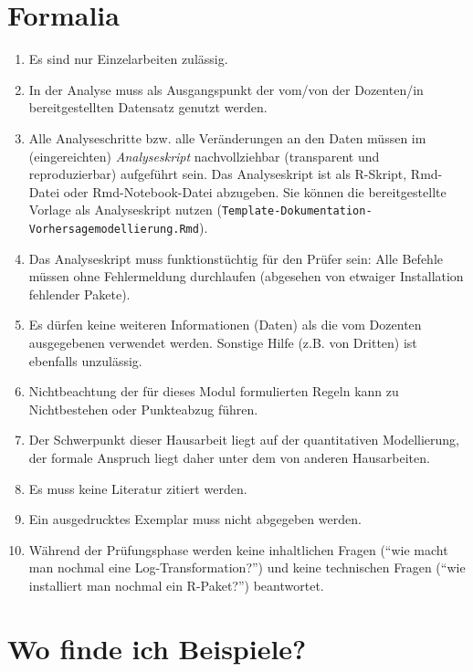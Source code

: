\documentclass[
]{book}
\begin{document}
\hypertarget{formalia}{%
\section{Formalia}\label{formalia}}

\begin{enumerate}
\def\labelenumi{\arabic{enumi}.}
\item
  Es sind nur Einzelarbeiten zulässig.
\item
  In der Analyse muss als Ausgangspunkt der vom/von der Dozenten/in bereitgestellten Datensatz genutzt werden.
\item
  Alle Analyseschritte bzw. alle Veränderungen an den Daten müssen im (eingereichten) \emph{Analyseskript} nachvollziehbar (transparent und reproduzierbar) aufgeführt sein. Das Analyseskript ist als R-Skript, Rmd-Datei oder Rmd-Notebook-Datei abzugeben. Sie können die bereitgestellte Vorlage als Analyseskript nutzen (\texttt{Template-Dokumentation-Vorhersagemodellierung.Rmd}).
\item
  Das Analyseskript muss funktionstüchtig für den Prüfer sein: Alle Befehle müssen ohne Fehlermeldung durchlaufen (abgesehen von etwaiger Installation fehlender Pakete).
\item
  Es dürfen keine weiteren Informationen (Daten) als die vom Dozenten ausgegebenen verwendet werden. Sonstige Hilfe (z.B. von Dritten) ist ebenfalls unzulässig.
\item
  Nichtbeachtung der für dieses Modul formulierten Regeln kann zu Nichtbestehen oder Punkteabzug führen.
\item
  Der Schwerpunkt dieser Hausarbeit liegt auf der quantitativen Modellierung, der formale Anspruch liegt daher unter dem von anderen Hausarbeiten.
\item
  Es muss keine Literatur zitiert werden.
\item
  Ein ausgedrucktes Exemplar muss nicht abgegeben werden.
\item
  Während der Prüfungsphase werden keine inhaltlichen Fragen (``wie macht man nochmal eine Log-Transformation?'') und keine technischen Fragen (``wie installiert man nochmal ein R-Paket?'') beantwortet.
\end{enumerate}

\hypertarget{wo-finde-ich-beispiele}{%
\section{Wo finde ich Beispiele?}\label{wo-finde-ich-beispiele}}
\end{document}
